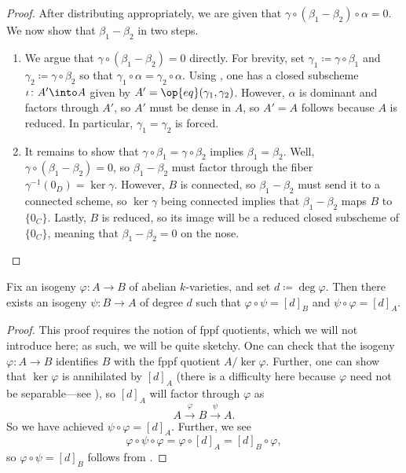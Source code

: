 \documentclass{amsart}
\begin{document}
\begin{proof}
	After distributing appropriately, we are given that $\gamma\circ(\beta_1-\beta_2)\circ\alpha=0$. We now show that $\beta_1-\beta_2$ in two steps.
	\begin{enumerate}
		\item We argue that $\gamma\circ(\beta_1-\beta_2)=0$ directly. For brevity, set $\gamma_1\coloneqq\gamma\circ\beta_1$ and $\gamma_2\coloneqq\gamma\circ\beta_2$ so that $\gamma_1\circ\alpha=\gamma_2\circ\alpha$. Using \cite[Exercise~11.4.A]{rising-sea}, one has a closed subscheme $\iota\colon A'\into A$ given by $A'=\op{eq}(\gamma_1,\gamma_2)$. However, $\alpha$ is dominant and factors through $A'$, so $A'$ must be dense in $A$, so $A'=A$ follows because $A$ is reduced. In particular, $\gamma_1=\gamma_2$ is forced.
		\item It remains to show that $\gamma\circ\beta_1=\gamma\circ\beta_2$ implies $\beta_1=\beta_2$. Well, $\gamma\circ(\beta_1-\beta_2)=0$, so $\beta_1-\beta_2$ must factor through the fiber $\gamma^{-1}(0_D)=\ker\gamma$. However, $B$ is connected, so $\beta_1-\beta_2$ must send it to a connected scheme, so $\ker\gamma$ being connected implies that $\beta_1-\beta_2$ maps $B$ to $\{0_C\}$. Lastly, $B$ is reduced, so its image will be a reduced closed subscheme of $\{0_C\}$, meaning that $\beta_1-\beta_2=0$ on the nose.
		\qedhere
	\end{enumerate}
\end{proof}
\begin{proposition} \label{prop:iso-reflect}
	Fix an isogeny $\varphi\colon A\to B$ of abelian $k$-varieties, and set $d\coloneqq\deg\varphi$. Then there exists an isogeny $\psi\colon B\to A$ of degree $d$ such that $\varphi\circ\psi=[d]_B$ and $\psi\circ\varphi=[d]_A$.
\end{proposition}
\begin{proof}
	This proof requires the notion of fppf quotients, which we will not introduce here; as such, we will be quite sketchy. One can check that the isogeny $\varphi\colon A\to B$ identifies $B$ with the fppf quotient $A/\ker\varphi$. Further, one can show that $\ker\varphi$ is annihilated by $[d]_A$ (there is a difficulty here because $\varphi$ need not be separable---see \cite[Exercise~4.4]{egm-av}), so $[d]_A$ will factor through $\varphi$ as
	\[A\stackrel\varphi\to B\stackrel\psi\to A.\]
	So we have achieved $\psi\circ\varphi=[d]_A$. Further, we see
	\[\varphi\circ\psi\circ\varphi=\varphi\circ[d]_A=[d]_B\circ\varphi,\]
	so $\varphi\circ\psi=[d]_B$ follows from .
\end{proof}
\end{document}
